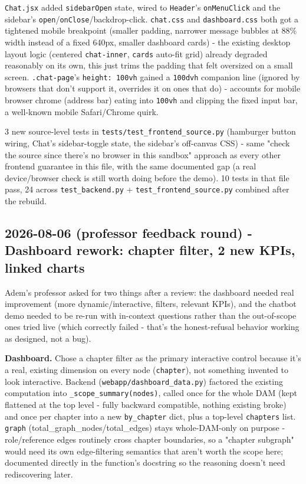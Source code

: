 \texttt{Chat.jsx} added \texttt{sidebarOpen} state, wired to \texttt{Header}'s \texttt{onMenuClick} and the sidebar's \texttt{open}/\texttt{onClose}/backdrop-click. \texttt{chat.css} and \texttt{dashboard.css} both got a tightened mobile breakpoint (smaller padding, narrower message bubbles at 88\% width instead of a fixed 640px, smaller dashboard cards) - the existing desktop layout logic (centered \texttt{chat-inner}, \texttt{cards} auto-fit grid) already degraded reasonably on its own, this just trims the padding that felt oversized on a small screen. \texttt{.chat-page}'s \texttt{height: 100vh} gained a \texttt{100dvh} companion line (ignored by browsers that don't support it, overrides it on ones that do) - accounts for mobile browser chrome (address bar) eating into \texttt{100vh} and clipping the fixed input bar, a well-known mobile Safari/Chrome quirk.

3 new source-level tests in \texttt{tests/\allowbreak{}test\_\allowbreak{}frontend\_\allowbreak{}source.py} (hamburger button wiring, Chat's sidebar-toggle state, the sidebar's off-canvas CSS) - same "check the source since there's no browser in this sandbox" approach as every other frontend guarantee in this file, with the same documented gap (a real device/browser check is still worth doing before the demo). 10 tests in that file pass, 24 across \texttt{test\_\allowbreak{}backend.py} + \texttt{test\_\allowbreak{}frontend\_\allowbreak{}source.py} combined after the rebuild.

\subsection*{2026-08-06 (professor feedback round) - Dashboard rework: chapter filter, 2 new KPIs, linked charts}
Adem's professor asked for two things after a review: the dashboard needed real improvement (more dynamic/interactive, filters, relevant KPIs), and the chatbot demo needed to be re-run with in-context questions rather than the out-of-scope ones tried live (which correctly failed - that's the honest-refusal behavior working as designed, not a bug).

\textbf{Dashboard.} Chose a chapter filter as the primary interactive control because it's a real, existing dimension on every node (\texttt{chapter}), not something invented to look interactive. Backend (\texttt{webapp/\allowbreak{}dashboard\_\allowbreak{}data.py}) factored the existing computation into \texttt{\_\allowbreak{}scope\_\allowbreak{}summary(nodes)}, called once for the whole DAM (kept flattened at the top level - fully backward compatible, nothing existing broke) and once per chapter into a new \texttt{by\_\allowbreak{}chapter} dict, plus a top-level \texttt{chapters} list. \texttt{graph} (total\_graph\_nodes/total\_edges) stays whole-DAM-only on purpose - role/reference edges routinely cross chapter boundaries, so a "chapter subgraph" would need its own edge-filtering semantics that aren't worth the scope here; documented directly in the function's docstring so the reasoning doesn't need rediscovering later.

